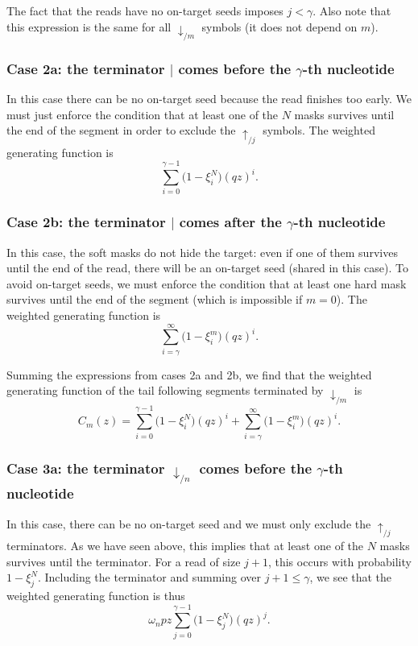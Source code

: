 \documentclass{article}
\begin{document}
The fact that the reads have no on-target seeds imposes $j < \gamma$. Also
note that this expression is the same for all $\downarrow_{/m}$ symbols
(it does not depend on $m$).

\subsubsection*{Case 2a: the terminator $|$ comes before the $\gamma$-th
nucleotide}

In this case there can be no on-target seed because the read finishes
too early. We must just enforce the condition that at least one of the $N$
masks survives until the end of the segment in order to exclude the
$\uparrow_{/j}$ symbols. The weighted generating function is
\begin{equation*}
\sum_{i=0}^{\gamma-1} \Big(1 - \xi_i^N \Big) (qz)^i.
\end{equation*}

\subsubsection*{Case 2b: the terminator $|$ comes after the $\gamma$-th
nucleotide}

In this case, the soft masks do not hide the target: even if one of them
survives until the end of the read, there will be an on-target seed
(shared in this case). To avoid on-target seeds, we must enforce the
condition that at least one hard mask survives until the end of the
segment (which is impossible if $m = 0$). The weighted generating function
is
\begin{equation*}
\sum_{i=\gamma}^\infty \Big(1 - \xi_i^m \Big) (qz)^i.
\end{equation*}

Summing the expressions from cases 2a and 2b, we find that the
weighted generating function of the tail following segments terminated by
$\downarrow_{/m}$ is
\begin{equation}
\label{eq:C}
C_m(z) =
\sum_{i=0}^{\gamma-1} \Big(1 - \xi_i^N \Big) (qz)^i +
  \sum_{i=\gamma}^\infty \Big(1 - \xi_i^m \Big) (qz)^i.
\end{equation}

\subsubsection*{Case 3a: the terminator $\downarrow_{/n}$ comes before the
$\gamma$-th nucleotide}

In this case, there can be no on-target seed and we must only exclude the
$\uparrow_{/j}$ terminators. As we have seen above, this implies that at
least one of the $N$ masks survives until the terminator. For a read of
size $j+1$, this occurs with probability $1-\xi_j^N$. Including the
terminator and summing over $j+1 \leq \gamma$, we see that the weighted
generating function is thus
\begin{equation}
\omega_n pz \sum_{j=0}^{\gamma-1} \Big(1 - \xi_j^N \Big) (qz)^j.
\end{equation}
\end{document}
